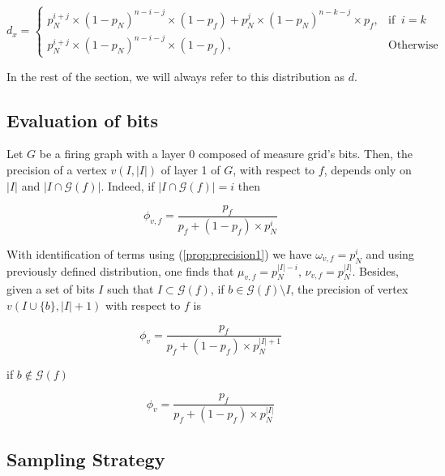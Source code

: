 \documentclass[a4paper, 11pt]{article}
\begin{document}
\begin{equation*}
d_{x} =  \begin{cases} p_N^{i+j} \times (1-p_N)^{n - i - j} \times (1- p_{f}) + p_N^{j} \times (1-p_N)^{n - k - j} \times p_{f}, & \text{if }\ i=k \\ p_N^{i+j} \times (1-p_N)^{n - i - j} \times (1- p_{f}), & \text{Otherwise} \end{cases}
\end{equation*}

In the rest of the section, we will always refer to this distribution as $d$.

\subsection{Evaluation of bits}

Let $G$ be a firing graph with a layer 0 composed of measure grid's bits. Then, the precision of a vertex $v(I,  \vert I \vert)$ of layer 1 of $G$, with respect to $f$, depends only on $\vert I \vert$ and $\vert I \cap \mathcal{G}(f) \vert$. Indeed, if $\vert I \cap \mathcal{G}(f) \vert = i$ then

\begin{equation*}
\phi_{v,f} = \frac{p_{f}}{p_{f} + (1 - p_{f})\times p_N^{i}}
\end{equation*}

With identification of terms using (\ref{prop:precision1}) we have $\omega_{v, f} = p_N^{i}$ and using previously defined distribution, one finds that $\mu_{v, f} = p_N^{\vert I \vert - i}$, $\nu_{v, f} = p_N^{\vert I \vert}$. Besides, given a set of bits $I$ such that  $I \subset \mathcal{G}(f)$, if $b \in \mathcal{G}(f) \setminus I$, the precision of vertex $v(I \cup \{ b \}, \vert I \vert +1)$ with respect to $f$ is 

\begin{equation*}
\phi_{v} = \frac{p_{f}}{p_{f} + (1 - p_{f})\times p_N^{\vert I \vert + 1}}
\end{equation*}

if  $b \notin \mathcal{G}(f)$

\begin{equation*}
\phi_{v} = \frac{p_{f}}{p_{f} + (1 - p_{f})\times p_N^{\vert I \vert}}
\end{equation*}


\subsection{Sampling Strategy}
\end{document}
